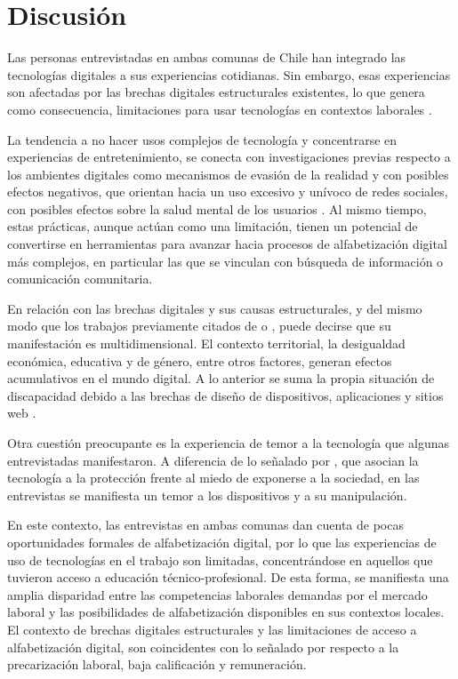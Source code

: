 \section{Discusión}\label{sec-discusión}

Las personas entrevistadas en ambas comunas de Chile han integrado las
tecnologías digitales a sus experiencias cotidianas. Sin embargo, esas
experiencias son afectadas por las brechas digitales estructurales
existentes, lo que genera como consecuencia, limitaciones para usar
tecnologías en contextos laborales \cite[P.11]{MORALES2020}.

La tendencia a no hacer usos complejos de tecnología y concentrarse en
experiencias de entretenimiento, se conecta con investigaciones previas
respecto a los ambientes digitales como mecanismos de evasión de la
realidad y con posibles efectos negativos, que orientan hacia un uso
excesivo y unívoco de redes sociales, con posibles efectos sobre la
salud mental de los usuarios \cite{CHARITSIS2022,XU2023}. Al mismo tiempo, estas prácticas, aunque actúan como una
limitación, tienen un potencial de convertirse en herramientas para
avanzar hacia procesos de alfabetización digital más complejos, en
particular las que se vinculan con búsqueda de información o
comunicación comunitaria.

En relación con las brechas digitales y sus causas estructurales, y del
mismo modo que los trabajos previamente citados de \textcite{PETHIG2021}
o \textcite{LONGORIA2022}, puede decirse que su manifestación es
multidimensional. El contexto territorial, la desigualdad económica,
educativa y de género, entre otros factores, generan efectos
acumulativos en el mundo digital. A lo anterior se suma la propia
situación de discapacidad debido a las brechas de diseño de
dispositivos, aplicaciones y sitios web \cite{EGARD2021,KELLY2016}.

Otra cuestión preocupante es la experiencia de temor a la tecnología que
algunas entrevistadas manifestaron. A diferencia de lo señalado por
\textcite{PETHIG2021}, que asocian la tecnología a la protección frente
al miedo de exponerse a la sociedad, en las entrevistas se manifiesta un
temor a los dispositivos y a su manipulación.

En este contexto, las entrevistas en ambas comunas dan cuenta de pocas
oportunidades formales de alfabetización digital, por lo que las
experiencias de uso de tecnologías en el trabajo son limitadas,
concentrándose en aquellos que tuvieron acceso a educación
técnico-profesional. De esta forma, se manifiesta una amplia disparidad
entre las competencias laborales demandas por el mercado laboral y las
posibilidades de alfabetización disponibles en sus contextos locales. El
contexto de brechas digitales estructurales y las limitaciones de acceso
a alfabetización digital, son coincidentes con lo señalado por \textcite{QU2022}
respecto a la precarización laboral, baja calificación y remuneración.

